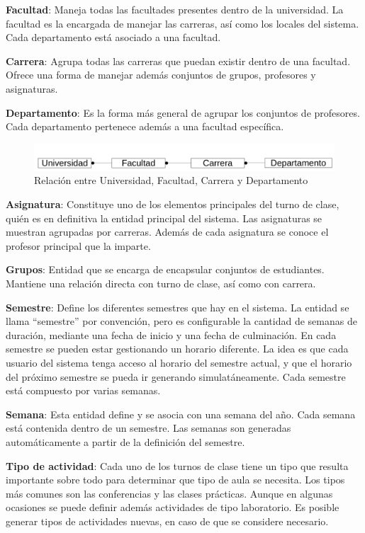 \textbf{Facultad}: Maneja todas las facultades presentes dentro de la universidad. La facultad es la encargada de manejar las carreras, así como los locales del sistema. Cada departamento está asociado a una facultad.

\textbf{Carrera}: Agrupa todas las carreras que puedan existir dentro de una facultad. Ofrece una forma de manejar además conjuntos de grupos, profesores y asignaturas.

\textbf{Departamento}: Es la forma más general de agrupar los conjuntos de profesores. Cada departamento pertenece además a una facultad específica.

\begin{figure}[h!]
	\centering
	\includegraphics[width=1\linewidth]{images/Chapter 3/univ_fac_carr_dep.png}
	\caption{Relación entre Universidad, Facultad, Carrera y Departamento}
	\label{fig:department_relation}
\end{figure}

\textbf{Asignatura}: Constituye uno de los elementos principales del turno de clase, quién es en definitiva la entidad principal del sistema. Las asignaturas se muestran agrupadas por carreras. Además de cada asignatura se conoce el profesor principal que la imparte.

\textbf{Grupos}: Entidad que se encarga de encapsular conjuntos de estudiantes. Mantiene una relación directa con turno de clase, así como con carrera. 

\textbf{Semestre}: Define los diferentes semestres que hay en el sistema. La entidad se llama “semestre” por convención, pero es configurable la cantidad de semanas de duración, mediante una fecha de inicio y una fecha de culminación. En cada semestre se pueden estar gestionando un horario diferente. La idea es que cada usuario del sistema tenga acceso al horario del semestre actual, y que el horario del próximo semestre se pueda ir generando simulatáneamente. Cada semestre está compuesto por varias semanas.

\textbf{Semana}: Esta entidad define y se asocia con una semana del año. Cada semana está contenida dentro de un semestre. Las semanas son generadas automáticamente a partir de la definición del semestre.

\textbf{Tipo de actividad}: Cada uno de los turnos de clase tiene un tipo que resulta importante sobre todo
 para determinar que tipo de aula se necesita. Los tipos más comunes son las conferencias y las clases
 prácticas. Aunque en algunas ocasiones se puede definir además actividades de tipo laboratorio. Es posible generar tipos de actividades nuevas, en caso de que se considere necesario.

